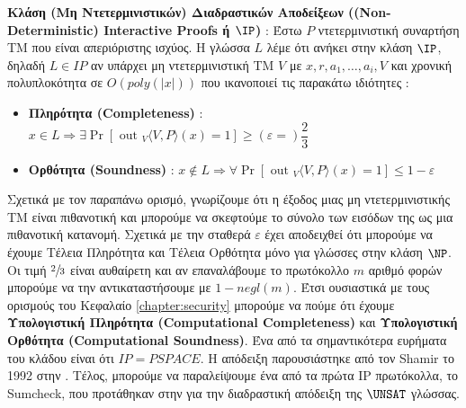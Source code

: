 \begin{definition}
\textbf{Κλάση (Μη Ντετερμινιστικών) Διαδραστικών Αποδείξεων ((Non-Deterministic) Interactive Proofs ή $\IP$)} : Έστω $P$ ντετερμινιστική συναρτήση ΤΜ που είναι απεριόριστης ισχύος. Η γλώσσα $L$ λέμε ότι ανήκει στην κλάση $\IP$, δηλαδή $L \in IP$ αν υπάρχει μη ντετερμινιστική ΤΜ $V$ με $x, r, a_{1}, \ldots, a_{i}, V$ και χρονική πολυπλοκότητα σε $O(poly(|x|))$ που ικανοποιεί τις παρακάτω ιδιότητες :
\begin{itemize}
    \item \textbf{Πληρότητα (Completeness)} : $x \in L \Rightarrow \exists \operatorname{Pr}\left[\text { out }_{V}\langle V, P\rangle(x)=1\right] \geq (ε=) \dfrac{2}{3}$
    \item \textbf{Ορθότητα (Soundness)} : $x \notin L \Rightarrow \forall \operatorname{Pr}\left[\text { out }_{V}\langle V, P\rangle(x)=1\right] \leq 1 - ε$
\end{itemize}
\end{definition}

Σχετικά με τον παραπάνω ορισμό, γνωρίζουμε ότι η έξοδος μιας μη ντετερμινιστικής ΤΜ είναι πιθανοτική και μπορούμε να σκεφτούμε το σύνολο των εισόδων της ως μια πιθανοτική κατανομή. Σχετικά με την σταθερά $ε$ έχει αποδειχθεί ότι μπορούμε να έχουμε Τέλεια Πληρότητα και Τέλεια Ορθότητα μόνο για γλώσσες στην κλάση $\NP$. Οι τιμή $\sfrac{2}{3}$ είναι αυθαίρετη και αν επαναλάβουμε το πρωτόκολλο $m$ αριθμό φορών μπορούμε να την αντικαταστήσουμε με $1-negl(m)$. Έτσι ουσιαστικά με τους ορισμούς του Κεφαλαίο \ref{chapter:security} μπορούμε να πούμε ότι έχουμε \textbf{Υπολογιστική Πληρότητα (Computational Completeness)} και \textbf{Υπολογιστική Ορθότητα (Computational Soundness)}. Ένα από τα σημαντικότερα ευρήματα του κλάδου είναι ότι $IP=PSPACE$. Η απόδειξη παρουσιάστηκε από τον Shamir το 1992 στην \cite{shamir1992ip}. Τέλος, μπορούμε να παραλείψουμε ένα από τα πρώτα IP πρωτόκολλα, το Sumcheck, που προτάθηκαν στην \cite{lund1992algebraic} για την διαδραστική απόδειξη της $\UNSAT$ γλώσσας.
